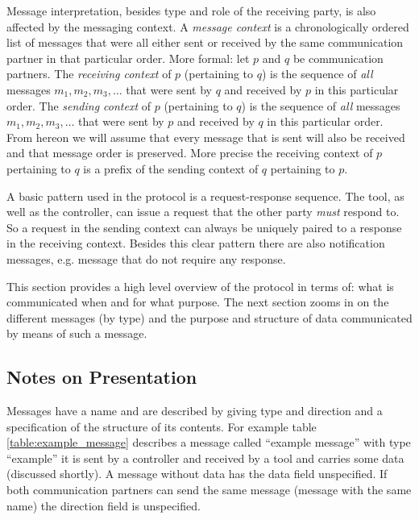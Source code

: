 \documentclass{article}
\begin{document}
  Message interpretation, besides type and role of the receiving party, is also
  affected by the messaging context.  A \textit{message context} is a
  chronologically ordered list of messages that were all either sent or
  received by the same communication partner in that particular order.  More
  formal: let $p$ and $q$ be communication partners. The \textit{receiving
  context} of $p$ (pertaining to $q$) is the sequence of \emph{all} messages
  $m_{1}, m_{2}, m_{3}, \ldots$ that were sent by $q$ and received by $p$ in
  this particular order.  The \textit{sending context} of $p$ (pertaining to
  $q$) is the sequence of \emph{all} messages $m_{1}, m_{2}, m_{3}, \ldots$
  that were sent by $p$ and received by $q$ in this particular order. From
  hereon we will assume that every message that is sent will also be received
  and that message order is preserved. More precise the receiving context of
  $p$ pertaining to $q$ is a prefix of the sending context of $q$ pertaining to
  $p$.

  A basic pattern used in the protocol is a request-response sequence. The
  tool, as well as the controller, can issue a request that the other party
  \emph{must} respond to. So a request in the sending context can always be
  uniquely paired to a response in the receiving context. Besides this clear
  pattern there are also notification messages, e.g. message that do not
  require any response.

  This section provides a high level overview of the protocol in terms of: what
  is communicated when and for what purpose. The next section zooms in on the
  different messages (by type) and the purpose and structure of data
  communicated by means of such a message.

  \subsection{Notes on Presentation}

   Messages have a name and are described by giving type and direction and a
   specification of the structure of its contents. For example table
   \ref{table:example_message} describes a message called ``example message''
   with type ``example'' it is sent by a controller and received by a tool and
   carries some data (discussed shortly). A message without data has the data
   field unspecified. If both communication partners can send the same message
   (message with the same name) the direction field is unspecified.
   
\end{document}
